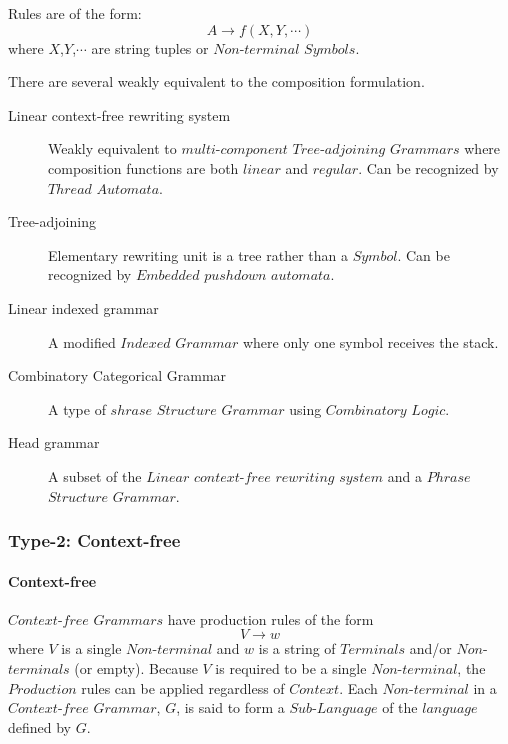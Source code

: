 \documentclass{article}
\begin{document}
Rules are of the form:
\[
    A \rightarrow f(X,Y,\cdots)
\]
where $X$,$Y$,$\cdots$ are string tuples or $Non$-$terminal$
$Symbols$.

There are several weakly equivalent to the composition formulation.

\begin{description}
\item[Linear context-free rewriting system]

    Weakly equivalent to $multi$-$component$ $Tree$-$adjoining$
    $Grammars$ where composition functions are both $linear$ and
    $regular$. Can be recognized by $Thread$ $Automata$.

\item[Tree-adjoining]

    Elementary rewriting unit is a tree rather than a $Symbol$. Can be
    recognized by $Embedded$ $pushdown$ $automata$.

\item[Linear indexed grammar]

    A modified $Indexed$ $Grammar$ where only one symbol receives the
    stack.

\item[Combinatory Categorical Grammar]

    A type of $shrase$ $Structure$ $Grammar$ using $Combinatory$
    $Logic$.

\item[Head grammar]

    A subset of the $Linear$ $context$-$free$ $rewriting$ $system$ and
    a $Phrase$ $Structure$ $Grammar$.

\end{description}

\subsubsection{Type-2: Context-free}

\paragraph{Context-free}
$Context$-$free$ $Grammars$ have production rules of the form
\[
    V \rightarrow w
\]
where $V$ is a single $Non$-$terminal$ and $w$ is a string of
$Terminals$ and/or $Non$-$terminals$ (or empty). Because $V$ is
required to be a single $Non$-$terminal$, the $Production$ rules can
be applied regardless of $Context$. Each $Non$-$terminal$ in a
$Context$-$free$ $Grammar$, $G$, is said to form a $Sub$-$Language$ of
the $language$ defined by $G$.
\end{document}

